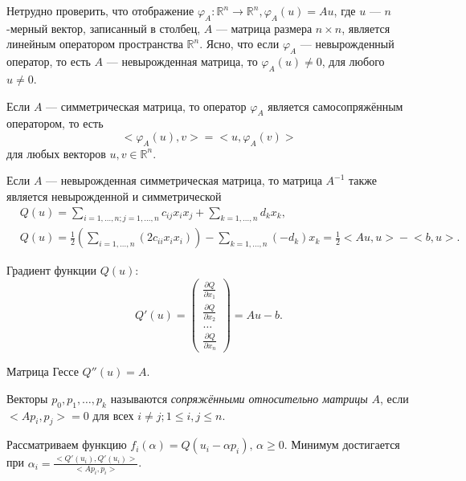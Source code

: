 \begin{utv}
	Нетрудно проверить, что отображение $\varphi_A : \mathbb{R}^n \to \mathbb{R}^n, \varphi_A(u) = A u$, где $u$ --- $n$-мерный вектор, записанный в столбец, $A$ --- матрица размера $n \times n$, является линейным оператором пространства $\mathbb{R}^n$. Ясно, что если $\varphi_A$ --- невырожденный оператор, то есть $A$ --- невырожденная матрица, то $\varphi_A(u) \not = 0$, для любого $u \not = 0$. 
	
	Если $A$ --- симметрическая матрица, то оператор $\varphi_A$ является самосопряжённым оператором, то есть
	\begin{equation*}
		\big<\varphi_A(u), v\big> = \big<u, \varphi_A(v)\big>
	\end{equation*}
	для любых векторов $u, v \in \mathbb{R}^n$.
	
	Если $A$ --- невырожденная симметрическая матрица, то матрица $A^{-1}$ также является невырожденной и симметрической
	\begin{align*}
		&Q(u) = \sum\limits_{i = 1, \dotsc, n; j = 1, \dotsc, n}{c_{ij} x_i x_j} + \sum\limits_{k = 1, \dotsc, n}{d_k x_k}, \\
		&Q(u) = \frac{1}{2} \left(\sum\limits_{i = 1, \dotsc, n}{(2c_{ii} x_i x_i)}\right) - \sum\limits_{k = 1, \dotsc, n}{(-d_k)x_k} = \frac{1}{2} \big<A u, u\big> - \big<b, u\big>.
	\end{align*}
	
	Градиент функции $Q(u)$: 
	\begin{equation*}
		Q'(u) = \begin{pmatrix}
			\frac{\partial Q}{\partial x_1} \\
			\frac{\partial Q}{\partial x_2} \\
			\dotsc \\
			\frac{\partial Q}{\partial x_n}
		\end{pmatrix} = A u - b.
	\end{equation*}
	
	Матрица Гессе $Q''(u) = A$.
\end{utv}

\begin{definition}
	Векторы $p_0, p_1, \dotsc, p_k$ называются \textit{сопряжёнными относительно матрицы} $A$, если $\big<A p_i, p_j\big> = 0$ для всех $i \not = j; 1 \leqslant i, j \leqslant n$.
\end{definition}

\begin{utv}
	Рассматриваем функцию $f_i(\alpha) = Q(u_i - \alpha p_i), \, \alpha \geqslant 0$. Минимум достигается при $\alpha_i = \frac{\big<Q'(u_i), Q'(u_i)\big>}{\big<A p_i, p_i\big>}$.
\end{utv}

